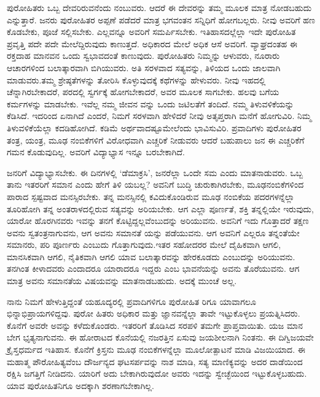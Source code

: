 ಪುರೋಹಿತರು ಒಬ್ಬ ದೇವರಿರುವನೆಂದು ನಂಬುವರು. ಆದರೆ ಈ ದೇವರನ್ನು ತಮ್ಮ ಮೂಲಕ ಮಾತ್ರ ನೋಡಬಹುದು ಎನ್ನುತ್ತಾರೆ. ಜನರು ಪುರೋಹಿತರ ಅಪ್ಪಣೆ ಪಡೆದರೆ ಮಾತ್ರ ಭಗವಂತನ ಸನ್ನಿಧಿಗೆ ಹೋಗಬಲ್ಲರು. ನೀವು ಅವರಿಗೆ ಹಣ ಕೊಡಬೇಕು, ಪೂಜೆ ಸಲ್ಲಿಸಬೇಕು. ಎಲ್ಲವನ್ನೂ ಅವರಿಗೆ ಸಮರ್ಪಿಸಬೇಕು. ಇತಿಹಾಸದಲ್ಲೆಲ್ಲಾ ಇದೇ ಪುರೋಹಿತ ಪ್ರವೃತ್ತಿ ಪದೇ ಪದೇ ಮೇಲೆದ್ದಿರುವುದು ಕಾಣುತ್ತದೆ. ಅಧಿಕಾರದ ಮೇಲೆ ಅಧಿಕ ಆಸೆ ಅವರಿಗೆ. ವ್ಯಾಘ್ರದಂತಹ ಈ ರಕ್ತದಾಹ ಮಾನವನ ಒಂದು ಸ್ವಭಾವದಂತೆ ಕಾಣುವುದು. ಪುರೋಹಿತರು ನಿಮ್ಮನ್ನು ಆಳುವರು, ನೂರಾರು ಆಚಾರಗಳಿಂದ ಬಲಾತ್ಕಾರವಾಗಿ ಬಿಗಿಯುವರು. ಅತಿ ಸರಳವಾದ ಸತ್ಯವನ್ನು, ತಿಳಿಯದ ಒಂದು ಜಾಲವಾಗಿ ಮಾಡುವರು.ತಮ್ಮ ಶ್ರೇಷ್ಠತೆಗಳನ್ನು ತೋರಿಸಿ ಕೊಳ್ಳುವುದಕ್ಕೆ ಕಥೆಗಳನ್ನು ಹೇಳುವರು. ನೀವು ಇಹದಲ್ಲಿ ಚೆನ್ನಾಗಿರಬೇಕಾದರೆ, ಪರದಲ್ಲಿ ಸ್ವರ್ಗಕ್ಕೆ ಹೋಗಬೇಕಾದರೆ, ಅವರ ಮೂಲಕ ಸಾಗಬೇಕು. ಹಲವು ಬಗೆಯ ಕರ್ಮಗಳನ್ನು ಮಾಡಬೇಕು. ಇವೆಲ್ಲ ನಮ್ಮ ಜೀವನ ವನ್ನು ಒಂದು ಜಟಿಲತೆಗೆ ತಂದಿದೆ. ನಮ್ಮ ತಿಳುವಳಿಕೆಯನ್ನು ಕೆಡಿಸಿದೆ. ಇದರಿಂದ ಏನಾಗಿದೆ ಎಂದರೆ, ನಿಮಗೆ ಸರಳವಾಗಿ ಹೇಳಿದರೆ ನೀವು ಅತೃಪ್ತರಾಗಿ ಮನೆಗೆ ಹೋಗುವಿರಿ. ನಿಮ್ಮ ತಿಳುವಳಿಕೆಯೆಲ್ಲಾ ಕದಡಿಹೋಗಿದೆ. ಕಡಿಮೆ ಅರ್ಥವಾದಷ್ಟೂಮೇಲೆಂದು ಭಾವಿಸುವಿರಿ. ಪ್ರವಾದಿಗಳು ಪುರೋಹಿತರ ತಂತ್ರ, ಯಂತ್ರ, ಮೂಢ ನಂಬಿಕೆಗಳಿಗೆ ವಿರೋಧವಾಗಿ ಎಚ್ಚರಿಕೆ ನೀಡುವರು ಆದರೆ ಬಹುಪಾಲು ಜನ ಈ ಎಚ್ಚರಿಕೆಗೆ ಗಮನ ಕೊಡುವುದಿಲ್ಲ. ಅವರಿಗೆ ವಿದ್ಯಾಭ್ಯಾಸ ಇನ್ನೂ ಬರಬೇಕಾಗಿದೆ.

ಜನರಿಗೆ ವಿದ್ಯಾಭ್ಯಾಸಬೇಕು. ಈ ದಿನಗಳಲ್ಲಿ ‘ಡೆಮಾಕ್ರಸಿ’, ಜನರೆಲ್ಲಾ ಒಂದೇ ಸಮ ಎಂದು ಮಾತನಾಡುವರು. ಒಬ್ಬ ತಾನು ಇತರರಿಗೆ ಸಮಾನ ಎಂದು ಹೇಗೆ ತಿಳಿ ಯಬಲ್ಲ? ಅವನಿಗೆ ಬುದ್ಧಿ ಚುರುಕಾಗಿರಬೇಕು, ಮೂಢನಂಬಿಕೆಗಳಿಂದ ಪಾರಾದ ಸ್ಪಷ್ಟವಾದ ಮನಸ್ಸಿರಬೇಕು. ತನ್ನ ಮನಸ್ಸಿನಲ್ಲಿ ಕವಿದುಕೊಂಡಿರುವ ಮೂಢ ನಂಬಿಕೆಯ ಪದರಗಳನ್ನೆಲ್ಲಾ ತೂರಿಹೋಗಿ ತನ್ನ ಅಂತರಾಳದಲ್ಲಿರುವ ಸತ್ಯವನ್ನು ಅರಿಯಬೇಕು. ಆಗ ಎಲ್ಲಾ ಪೂರ್ಣತೆ, ಶಕ್ತಿ ತನ್ನಲ್ಲಿಯೇ ಇರುವುದು, ಯಾರೋ ಹೊರಗಿನವರು ಇವನ್ನು ತನಗೆ ಕೊಟ್ಟಿದ್ದಲ್ಲವೆಂಬುದನ್ನು ಅರಿಯುವನು. ಅವನಿಗೆ ಇದು ಗೊತ್ತಾದರೆ ತಕ್ಷಣ ಅವನು ಸ್ವತಂತ್ರನಾಗುವನು, ಆಗ ಅವನು ಸಮಾನತೆ ಯನ್ನು ಪಡೆಯುವನು. ಆಗ ಅವನಿಗೆ ಎಲ್ಲರೂ ತನ್ನಂತೆಯೇ ಸಮಾನರು, ಪರಿ ಪೂರ್ಣರು ಎಂಬುದು ಗೊತ್ತಾಗುವುದು.ಇತರ ಸಹೋದರರ ಮೇಲೆ ದೈಹಿಕವಾಗಿ ಆಗಲಿ, ಮಾನಸಿಕವಾಗಿ ಆಗಲಿ, ನೈತಿಕವಾಗಿ ಆಗಲಿ ಯಾವ ಬಲಾತ್ಕಾರವನ್ನು ಹೇರಕೂಡದು ಎಂಬುದನ್ನು ಅರಿಯುವನು. ತನಗಿಂತ ಕೀಳಾದವರು ಎಂದಾದರೂ ಯಾರಾದರೂ ಇದ್ದರು ಎಂಬ ಭಾವನೆಯನ್ನು ಅವನು ತೊರೆಯುವನು. ಆಗ ಮಾತ್ರ ಅವನು ಸಮಾನತೆಯ ವಿಷಯವನ್ನು ಮಾತನಾಡಬಹುದು. ಅದಕ್ಕೆ ಮುಂಚೆ ಅಲ್ಲ.

ನಾನು ನಿಮಗೆ ಹೇಳುತ್ತಿದ್ದಂತೆ ಯಹೂದ್ಯರಲ್ಲಿ ಪ್ರವಾದಿಗಳಿಗೂ ಪುರೋಹಿತ ರಿಗೂ ಯಾವಾಗಲೂ ಭಿನ್ನಾಭಿಪ್ರಾಯಗಳಿದ್ದವು. ಪುರೋ ಹಿತರು ಅಧಿಕಾರ ಮತ್ತು ಜ್ಞಾನವನ್ನೆಲ್ಲಾ ತಾವೇ ಇಟ್ಟುಕೊಳ್ಳಲು ಪ್ರಯತ್ನಿಸಿದರು. ಕೊನೆಗೆ ಅವರೇ ಅವನ್ನು ಕಳೆದುಕೊಂಡರು. ಇತರರಿಗೆ ತೊಡಿಸಿದ ಸರಪಳಿ ತಮಗೇ ಪ್ರಾಪ್ತವಾಯಿತು. ಯಜ ಮಾನ ಬೇಗ ಭೃತ್ಯನಾಗುವನು. ಈ ಹೋರಾಟದ ಕೊನೆಯಲ್ಲಿ ನಜರತ್ತಿನ ಏಸುವು ಜಯಶೀಲನಾಗಿ ನಿಂತನು. ಈ ದಿಗ್ವಿಜಯವೇ ಕ್ರೈಸ್ತಧರ್ಮದ ಇತಿಹಾಸ. ಕೊನೆಗೆ ಕ್ರಿಸ್ತನು ಮೂಢ ನಂಬಿಕೆಗಳನ್ನೆಲ್ಲಾ ಮೂಲೋತ್ಪಾಟನೆ ಮಾಡಿ ವಿಜಯಿಯಾದ. ಈ ಮಹಾತ್ಮ ಪೌರೋಹಿತ್ಯವೆಂಬ ದೌರ್ಜನ್ಯದ ಘಟಸರ್ಪವನ್ನು ನಾಶ ಮಾಡಿ, ಸತ್ಯ ಮಾಣಿಕ್ಯವನ್ನು ಅದರ ದಾಡೆಯಿಂದ ರಕ್ಷಿಸಿ ಜಗತ್ತಿಗೆ ನೀಡಿದನು. ಯಾರಿಗೆ ಅದು ಬೇಕಾಗಿರುವುದೋ ಅವರು ಇದನ್ನು ಸ್ವೇಚ್ಛೆಯಿಂದ ಇಟ್ಟುಕೊಳ್ಳಬಹುದು. ಯಾವ ಪುರೋಹಿತನಿಗೂ ಅದಕ್ಕಾಗಿ ಶರಣಾಗಬೇಕಾಗಿಲ್ಲ.

